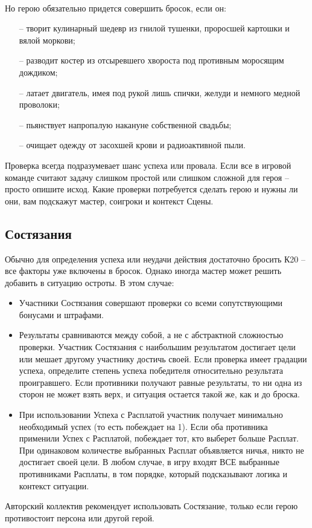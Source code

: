 \paragraph{}Но герою обязательно придется совершить бросок, если он:
\begin{itemize}
\item[--]творит кулинарный шедевр из гнилой тушенки, проросшей картошки и вялой моркови;
\item[--]разводит костер из отсыревшего хвороста под противным моросящим дождиком;
\item[--]латает двигатель, имея под рукой лишь спички, желуди и немного медной проволоки;
\item[--]пьянствует напропалую накануне собственной свадьбы;
\item[--]очищает одежду от засохшей крови и радиоактивной пыли.
\end{itemize}
\begin{tcolorbox}
Проверка всегда подразумевает шанс успеха или провала. Если все в игровой команде считают задачу слишком простой или слишком сложной для героя – просто опишите исход.
\newline Какие проверки потребуется сделать герою и нужны ли они, вам подскажут мастер, соигроки и контекст Сцены.
\end{tcolorbox}

\subsection{Состязания}
Обычно для определения успеха или неудачи действия достаточно бросить К20 – все факторы уже включены в бросок. Однако иногда мастер может решить добавить в ситуацию остроты. В этом случае:
\begin{itemize}
    \item Участники Состязания совершают проверки со всеми сопутствующими бонусами и штрафами. 
    \item Результаты сравниваются между собой, а не с абстрактной сложностью проверки. Участник Состязания с наибольшим результатом достигает цели или мешает другому участнику достичь своей. 
    \newline Если проверка имеет градации успеха, определите степень успеха победителя относительно результата проигравшего. Если противники получают равные результаты, то ни одна из сторон не может взять верх, и ситуация остается такой же, как и до броска. 
    \item При использовании Успеха с Расплатой участник получает минимально необходимый успех (то есть побеждает на 1). Если оба противника применили Успех с Расплатой, побеждает тот, кто выберет больше Расплат. При одинаковом количестве выбранных Расплат объявляется ничья, никто не достигает своей цели. В любом случае, в игру входят ВСЕ выбранные противниками Расплаты, в том порядке, который подсказывают логика и контекст ситуации. 
\end{itemize}
\begin{tcolorbox}
Авторский коллектив рекомендует использовать Состязание, только если герою противостоит персона или другой герой.
\end{tcolorbox}

